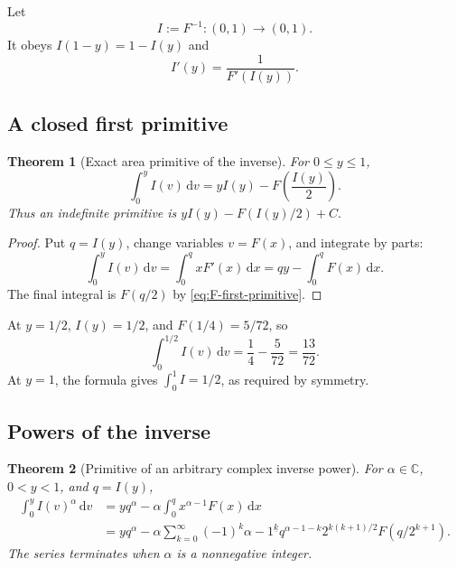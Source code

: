 \documentclass[11pt]{article}
\newtheorem{theorem}{Theorem}[section]
\theoremstyle{definition}
\theoremstyle{remark}
\newcommand{\C}{\mathbb C}
\newcommand{\dd}{\,\mathrm d}
\newcommand{\fall}[2]{#1^{\underline{#2}}}
\begin{document}
Let
\begin{equation}
 I:=F^{-1}:(0,1)\to(0,1).                                 \label{eq:inverse-def}
\end{equation}
It obeys \(I(1-y)=1-I(y)\) and
\begin{equation}
 I'(y)=\frac1{F'(I(y))}.                                  \label{eq:inverse-derivative}
\end{equation}

\subsection{A closed first primitive}

\begin{theorem}[Exact area primitive of the inverse]
\label{thm:inverse-primitive}
For \(0\le y\le1\),
\begin{equation}
 \boxed{
 \int_0^y I(v)\dd v
 =yI(y)-F\!\left(\frac{I(y)}2\right).
 }                                                        \label{eq:inverse-primitive-closed}
\end{equation}
Thus an indefinite primitive is
\(
 yI(y)-F(I(y)/2)+C.
\)
\end{theorem}

\begin{proof}
Put \(q=I(y)\), change variables \(v=F(x)\), and integrate by parts:
\[
 \int_0^yI(v)\dd v
 =\int_0^q xF'(x)\dd x
 =qy-\int_0^qF(x)\dd x.
\]
The final integral is \(F(q/2)\) by \eqref{eq:F-first-primitive}.
\end{proof}

At \(y=1/2\), \(I(y)=1/2\), and \(F(1/4)=5/72\), so
\begin{equation}
 \int_0^{1/2}I(v)\dd v=\frac14-\frac5{72}=\frac{13}{72}. \label{eq:inverse-half-area}
\end{equation}
At \(y=1\), the formula gives \(\int_0^1I=1/2\), as required by symmetry.

\subsection{Powers of the inverse}

\begin{theorem}[Primitive of an arbitrary complex inverse power]
\label{thm:inverse-power-primitive}
For \(\alpha\in\C\), \(0<y<1\), and \(q=I(y)\),
\begin{align}
 \int_0^yI(v)^\alpha\dd v
 &=yq^\alpha-\alpha\int_0^qx^{\alpha-1}F(x)\dd x          \label{eq:inverse-power-basic}\\
 &=yq^\alpha-\alpha\sum_{k=0}^{\infty}(-1)^k
   \fall{\alpha-1}{k}q^{\alpha-1-k}
   2^{k(k+1)/2}F(q/2^{k+1}).                              \label{eq:inverse-power-series}
\end{align}
The series terminates when \(\alpha\) is a nonnegative integer.
\end{theorem}
\end{document}
